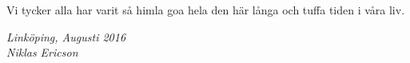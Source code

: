 \begin{acknowledgments}
  Vi tycker alla har varit så himla goa hela den här långa och tuffa tiden i våra liv.

  \addvspace{1em}
  \begin{flushright}
    \textit{%
      Linköping, Augusti 2016\\
      Niklas Ericson%
    }
  \end{flushright}
\end{acknowledgments}
